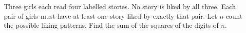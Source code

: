 Three girls each read four labelled stories. No story is liked by all three. Each pair of girls must have at least one story liked by exactly that pair. Let $n$ count the possible liking patterns. Find the sum of the squares of the digits of $n$.
